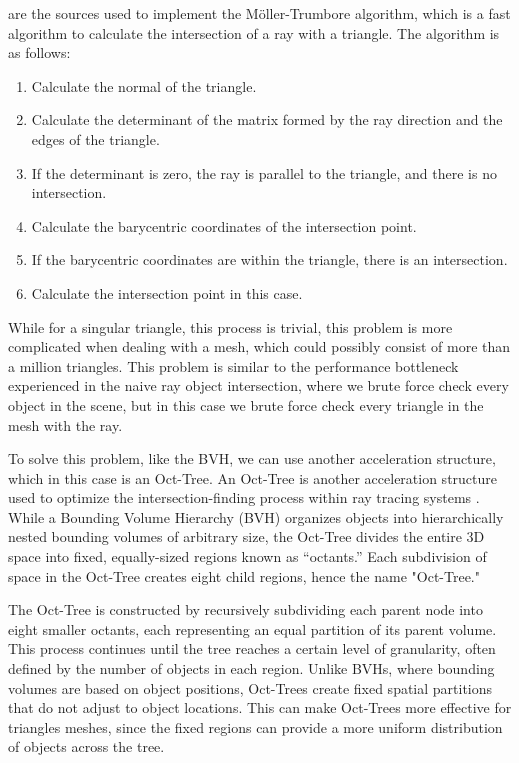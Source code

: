 \documentclass[../main.tex]{subfiles}
\begin{document}
\cite{woop_watertight_2013, moller_fast_1997} are the sources used to implement the M\"{o}ller-Trumbore algorithm, which is a fast algorithm to calculate the intersection of a ray with a triangle. 
The algorithm is as follows:
\begin{enumerate}
  \item Calculate the normal of the triangle.
  \item Calculate the determinant of the matrix formed by the ray direction and the edges of the triangle.
  \item If the determinant is zero, the ray is parallel to the triangle, and there is no intersection.
  \item Calculate the barycentric coordinates of the intersection point.
  \item If the barycentric coordinates are within the triangle, there is an intersection.
  \item Calculate the intersection point in this case.
\end{enumerate}

While for a singular triangle, this process is trivial, this problem is more complicated when 
dealing with a mesh, which could possibly consist of more than a million triangles. This problem
is similar to the performance bottleneck experienced in the naive ray object intersection, where we 
brute force check every object in the scene, but in this case we brute force check every triangle in the mesh with the ray.

To solve this problem, like the BVH, we can use another acceleration structure, which in this case is an Oct-Tree. 
An Oct-Tree is another acceleration structure used to optimize the intersection-finding process within ray tracing systems \cite{meagher_octree_1980}. 
While a Bounding Volume Hierarchy (BVH) organizes objects into hierarchically nested bounding volumes of arbitrary size, 
the Oct-Tree divides the entire 3D space into fixed, equally-sized regions known as “octants.” Each subdivision of space 
in the Oct-Tree creates eight child regions, hence the name "Oct-Tree."

The Oct-Tree is constructed by recursively subdividing each parent node into eight smaller octants, each representing an 
equal partition of its parent volume. This process continues until the tree reaches a certain level of granularity, 
often defined by the number of objects in each region. Unlike BVHs, where bounding volumes are based on object positions, 
Oct-Trees create fixed spatial partitions that do not adjust to object locations. This can make Oct-Trees more effective 
for triangles meshes, since the fixed regions can provide a more uniform distribution of objects across the tree.
\end{document}
